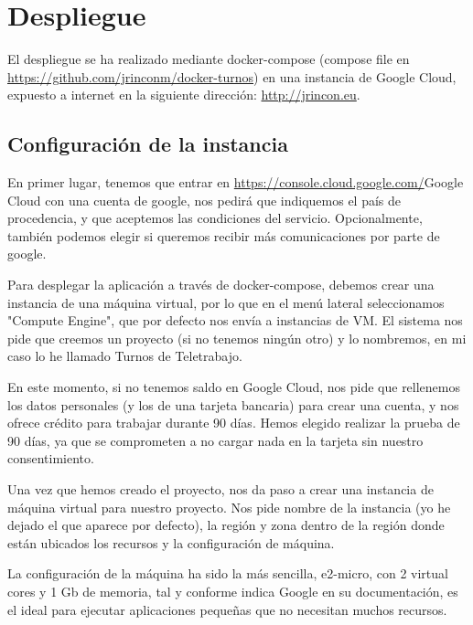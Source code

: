 \documentclass[11pt,spanish,listoffigures,listoftables]{tfgetsinf}
\begin{document}
\chapter{Despliegue}

El despliegue se ha realizado mediante docker-compose (compose file en \url{https://github.com/jrinconm/docker-turnos}) en una instancia de Google Cloud, expuesto a internet en la siguiente dirección:
\url{http://jrincon.eu}.

\section{Configuración de la instancia}
En primer lugar, tenemos que entrar en \url{https://console.cloud.google.com/}{Google Cloud} con una cuenta de google, nos pedirá que indiquemos el país de procedencia, y que aceptemos las condiciones del servicio.
Opcionalmente, también podemos elegir si queremos recibir más comunicaciones por parte de google.

Para desplegar la aplicación a través de docker-compose, debemos crear una instancia de una máquina virtual, por lo que en el menú lateral seleccionamos "Compute Engine", que por defecto nos envía a instancias de VM.
El sistema nos pide que creemos un proyecto (si no tenemos ningún otro) y lo nombremos, en mi caso lo he llamado Turnos de Teletrabajo.

En este momento, si no tenemos saldo en Google Cloud, nos pide que rellenemos los datos personales (y los de una tarjeta bancaria) para crear una cuenta, y nos ofrece crédito para trabajar durante 90 días. 
Hemos elegido realizar la prueba de 90 días, ya que se comprometen a no cargar nada en la tarjeta sin nuestro consentimiento.

Una vez que hemos creado el proyecto, nos da paso a crear una instancia de máquina virtual para nuestro proyecto. 
Nos pide nombre de la instancia (yo he dejado el que aparece por defecto), la región y zona dentro de la región donde están ubicados los recursos y la configuración de máquina.

La configuración de la máquina ha sido la más sencilla, e2-micro, con 2 virtual cores y 1 Gb de memoria, tal y conforme indica Google en su documentación, es el ideal para ejecutar aplicaciones pequeñas que no necesitan muchos recursos.
\end{document}
